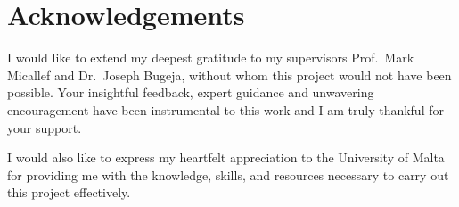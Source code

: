 \chapter*{Acknowledgements}

I would like to extend my deepest gratitude to my supervisors Prof.\ Mark
Micallef and Dr.\ Joseph Bugeja, without whom this project would not have been
possible. Your insightful feedback, expert guidance and unwavering
encouragement have been instrumental to this work and I am truly thankful for
your support.

I would also like to express my heartfelt appreciation to the University of
Malta for providing me with the knowledge, skills, and resources necessary to carry
out this project effectively.